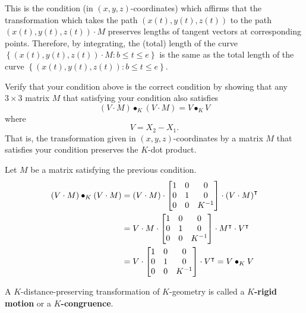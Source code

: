 \documentclass{ximera}
\begin{document}
This is the condition (in $\left(  x,y,z\right)  $-coordinates) which affirms
that the transformation which takes the path $\left(  x(t),y(t),z(t)\right)  $
to the path $\left(  x(t),y(t),z(t)\right)  \cdot M$ preserves lengths of
tangent vectors at corresponding points. Therefore, by integrating, the
(total) length of the curve $\left\{  \left(  x(t),y(t),z(t)\right)  \cdot
M:b\leq t\leq e\right\}  $ is the same as the total length of the curve
$\left\{  \left(  x(t),y(t),z(t)\right)  :b\leq t\leq e\right\}  $.

\begin{problem}
Verify that your condition above is the correct condition by showing
that any $3\times3$ matrix $M$ that satisfying your condition also satisfies%
\[
\left(   V  \cdot M\right)  \bullet_{K}\left(   V
\cdot M\right)  =V\bullet_{K}V
\]
where%
\[
V=X_{2}-X_{1}.
\]
That is, the transformation given in $\left( x,y,z\right)
$-coordinates by a matrix $M$ that satisfies your condition preserves
the $K$-dot product.

\begin{freeResponse} 
Let $M$ be a matrix satisfying the previous condition. 
\begin{align*}
\left(   V  \cdot M\right)  \bullet_{K}\left(   V
\cdot M\right)  
&= \left(   V  \cdot M\right) \cdot
 \begin{bmatrix}
1 & 0 & 0\\
0 & 1 & 0\\
0 & 0 & K^{-1}
\end{bmatrix} \cdot \left(   V
\cdot M\right)^\intercal \\
&= V  \cdot M \cdot 
 \begin{bmatrix}
1 & 0 & 0\\
0 & 1 & 0\\
0 & 0 & K^{-1}
\end{bmatrix} \cdot M^\intercal \cdot V^\intercal \\
&= V \cdot \begin{bmatrix}
1 & 0 & 0\\
0 & 1 & 0\\
0 & 0 & K^{-1}
\end{bmatrix} \cdot V^\intercal = V\bullet_{K}V
\end{align*}
\end{freeResponse}

\end{problem}





\begin{definition}
A $K$-distance-preserving transformation of $K$-geometry is called a
$K$\textbf{-rigid motion} or a $K$\textbf{-congruence}.
\end{definition}
\end{document}
